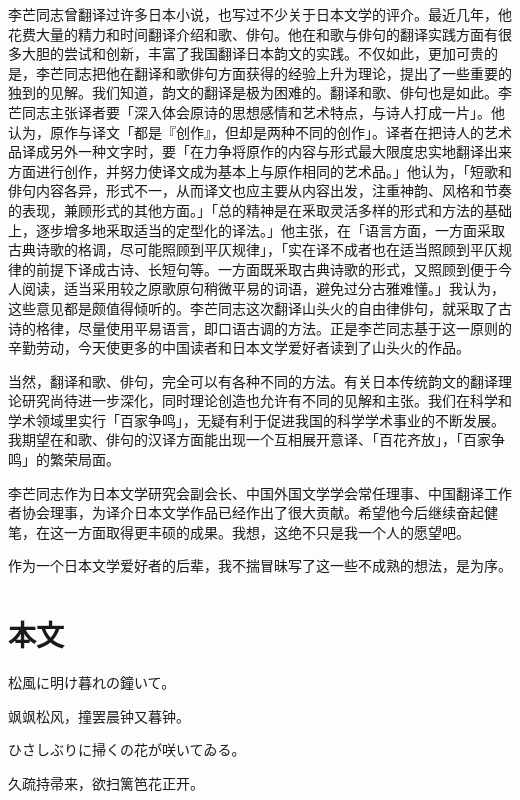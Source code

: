{李芒同志曾翻译过许多日本小说，也写过不少关于日本文学的评介。最近几年，他花费大量的精力和时间翻译介绍和歌、俳句。他在和歌与俳句的翻译实践方面有很多大胆的尝试和创新，丰富了我国翻译日本韵文的实践。不仅如此，更加可贵的是，李芒同志把他在翻译和歌俳句方面获得的经验上升为理论，提出了一些重要的独到的见解。我们知道，韵文的翻译是极为困难的。翻译和歌、俳句也是如此。李芒同志主张译者要「深入体会原诗的思想感情和艺术特点，与诗人打成一片」。他认为，原作与译文「都是『创作』，但却是两种不同的创作」。译者在把诗人的艺术品译成另外一种文字时，要「在力争将原作的内容与形式最大限度忠实地翻译出来方面进行创作，并努力使译文成为基本上与原作相同的艺术品。」他认为，「短歌和俳句内容各异，形式不一，从而译文也应主要从内容出发，注重神韵、风格和节奏的表现，兼顾形式的其他方面。」「总的精神是在釆取灵活多样的形式和方法的基础上，逐步增多地釆取适当的定型化的译法。」他主张，在「语言方面，一方面采取古典诗歌的格调，尽可能照顾到平仄规律」，「实在译不成者也在适当照顾到平仄规律的前提下译成古诗、长短句等。一方面既釆取古典诗歌的形式，又照顾到便于今人阅读，适当采用较之原歌原句稍微平易的词语，避免过分古雅难懂。」我认为，这些意见都是颇值得倾听的。李芒同志这次翻译山头火的自由律俳句，就采取了古诗的格律，尽量使用平易语言，即口语古调的方法。正是李芒同志基于这一原则的辛勤劳动，今天使更多的中国读者和日本文学爱好者读到了山头火的作品。

当然，翻译和歌、俳句，完全可以有各种不同的方法。有关日本传统韵文的翻译理论研究尚待进一步深化，同时理论创造也允许有不同的见解和主张。我们在科学和学术领域里实行「百家争鸣」，无疑有利于促进我国的科学学术事业的不断发展。我期望在和歌、俳句的汉译方面能出现一个互相展开意译、「百花齐放」，「百家争鸣」的繁荣局面。

李芒同志作为日本文学研究会副会长、中国外国文学学会常任理事、中国翻译工作者协会理事，为译介日本文学作品已经作出了很大贡献。希望他今后继续奋起健笔，在这一方面取得更丰硕的成果。我想，这绝不只是我一个人的愿望吧。

作为一个日本文学爱好者的后辈，我不揣冒昧写了这一些不成熟的想法，是为序。
}

\chapter{\FK 本文}
\setcounter{haikucounter}{0}

\begin{haiku}
    {\FH 松風に明け暮れの鐘いて。}

    {\FK 飒飒松风，撞罢晨钟又暮钟。}
\end{haiku}

\begin{haiku}
    {\FH ひさしぶりに掃くの花が咲いてゐる。}

    {\FK 久疏持帚来，欲扫篱笆花正开。}
\end{haiku}

